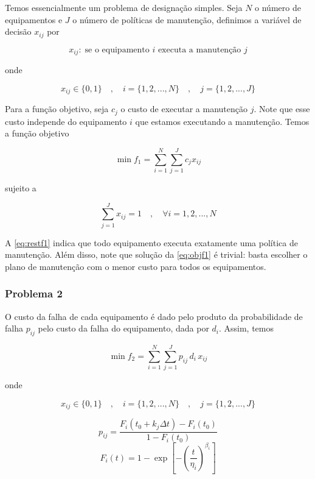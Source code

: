 \documentclass[conference]{IEEEtran}
\newcommand{\un}[1]{\;\text{#1}}
\begin{document}
Temos essencialmente um problema de designação simples. Seja $N$ o número de 
equipamentos e $J$ o número de políticas de manutenção, definimos a variável de decisão $x_{ij}$ 
por

\begin{equation}
	x_{ij}: \un{se o equipamento $i$ executa a manutenção $j$}
\end{equation}

\noindent onde 

\[ x_{ij} \in \{0,1\} \quad , \quad i = \{1, 2, ..., N\}  \quad , \quad j = \{1, 2, ..., J\} \]

Para a função objetivo, seja $c_j$ o custo de executar a manutenção $j$. Note que esse custo 
independe do equipamento $i$ que estamos executando a manutenção. Temos a função objetivo  

\begin{equation}\label{eq:objf1}
	\min f_1 = \sum_{i=1}^{N} \sum_{j=1}^{J} c_j x_{ij}
\end{equation}

\noindent sujeito a 

\begin{equation}\label{eq:restf1}
	\sum_{j=1}^{J} x_{ij} = 1 \quad , \quad \forall i = {1, 2, ..., N}
\end{equation}

A \ref{eq:restf1} indica que todo equipamento executa exatamente uma política de manutenção.
Além disso, note que solução da \ref{eq:objf1} é trivial: basta escolher o plano de 
manutenção com o menor custo para todos os equipamentos.

\subsubsection{Problema 2}

O custo da falha de cada equipamento é dado pelo produto da probabilidade de falha $p_{ij}$ pelo custo da falha do equipamento,
dada por $d_i$. Assim, temos 

\begin{equation}\label{eq:objf2}
	\min f_2 = \sum_{i=1}^{N} \sum_{j=1}^{J} p_{ij} \, d_i \, x_{ij}
\end{equation}

\noindent onde 

\[ x_{ij} \in \{0,1\} \quad , \quad i = \{1, 2, ..., N\}  \quad , \quad j = \{1, 2, ..., J\} \]


\begin{equation}\label{eq:pij}
	p_{ij} = \frac{F_i \left(t_0 + k_j \Delta t \right) - F_i\left(t_0\right) }{1 - F_i\left(t_0\right)}
\end{equation}
\begin{equation}\label{eq:fit}
	F_i(t) = 1 - \exp \left[ - \left( \frac{t}{\eta_i} \right)^{\beta_i} \right]
\end{equation}
\end{document}
